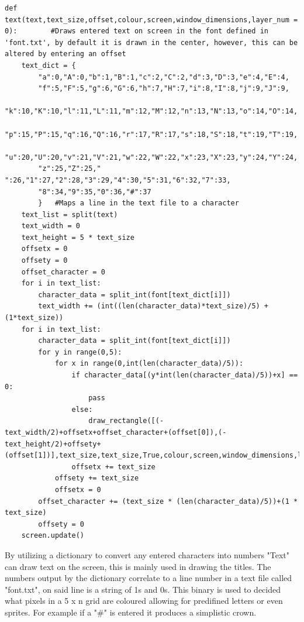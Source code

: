\begin{lstlisting}
def text(text,text_size,offset,colour,screen,window_dimensions,layer_num = 0):        #Draws entered text on screen in the font defined in 'font.txt', by default it is drawn in the center, however, this can be altered by entering an offset
    text_dict = {                                                       
        "a":0,"A":0,"b":1,"B":1,"c":2,"C":2,"d":3,"D":3,"e":4,"E":4,
        "f":5,"F":5,"g":6,"G":6,"h":7,"H":7,"i":8,"I":8,"j":9,"J":9,
        "k":10,"K":10,"l":11,"L":11,"m":12,"M":12,"n":13,"N":13,"o":14,"O":14,
        "p":15,"P":15,"q":16,"Q":16,"r":17,"R":17,"s":18,"S":18,"t":19,"T":19,
        "u":20,"U":20,"v":21,"V":21,"w":22,"W":22,"x":23,"X":23,"y":24,"Y":24,
        "z":25,"Z":25," ":26,"1":27,"2":28,"3":29,"4":30,"5":31,"6":32,"7":33,
        "8":34,"9":35,"0":36,"#":37
        }   #Maps a line in the text file to a character
    text_list = split(text)
    text_width = 0
    text_height = 5 * text_size
    offsetx = 0
    offsety = 0
    offset_character = 0
    for i in text_list:
        character_data = split_int(font[text_dict[i]])
        text_width += (int((len(character_data)*text_size)/5) + (1*text_size))
    for i in text_list:
        character_data = split_int(font[text_dict[i]])
        for y in range(0,5):
            for x in range(0,int(len(character_data)/5)):
                if character_data[(y*int(len(character_data)/5))+x] == 0:
                    pass
                else:
                    draw_rectangle([(-text_width/2)+offsetx+offset_character+(offset[0]),(-text_height/2)+offsety+(offset[1])],text_size,text_size,True,colour,screen,window_dimensions,layer_num)
                offsetx += text_size
            offsety += text_size
            offsetx = 0
        offset_character += (text_size * (len(character_data)/5))+(1 * text_size)
        offsety = 0
    screen.update()
\end{lstlisting}
By utilizing a dictionary to convert any entered characters into numbers "Text" can draw text on the screen, this is mainly used in drawing the titles. The numbers output by the dictionary correlate to a line number in a text file called "font.txt", on said line is a string of 1s and 0s. This binary is used to decided what pixels in a 5 x n grid are coloured allowing for predifined letters or even sprites. For example if a "\#" is entered it produces a simplistic crown.

